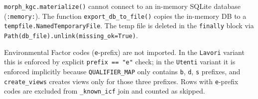 ﻿\documentclass[12pt,a4paper]{article}
\begin{document}
\vspace{0.6em}

\begin{tcolorbox}[colback=warnred!40, colframe=red!60!black,
                  title=Warning: Morph-KGC requires a file-based SQLite database]
\texttt{morph\_kgc.materialize()} cannot connect to an in-memory SQLite database (\texttt{:memory:}). The function \texttt{export\_db\_to\_file()} copies the in-memory DB to a \texttt{tempfile.NamedTemporaryFile}. The temp file is deleted in the \texttt{finally} block via \texttt{Path(db\_file).unlink(missing\_ok=True)}.
\end{tcolorbox}

\vspace{0.6em}

\begin{tcolorbox}[colback=importantbg!60, colframe=green!50!black,
                  title=Important: E-prefix ICF codes are not supported]
Environmental Factor codes (\texttt{e}-prefix) are not imported. In the \texttt{Lavori} variant this is enforced by explicit \texttt{prefix == "e"} check; in the \texttt{Utenti} variant it is enforced implicitly because \texttt{QUALIFIER\_MAP} only contains \texttt{b}, \texttt{d}, \texttt{s} prefixes, and \texttt{create\_views} creates views only for those three prefixes. Rows with \texttt{e}-prefix codes are excluded from \texttt{\_known\_icf} join and counted as skipped.
\end{tcolorbox}
\end{document}
